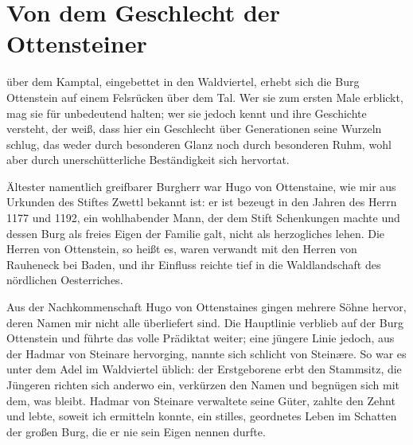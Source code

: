 
\section{Von dem Geschlecht der Ottensteiner}

 über dem Kamptal, eingebettet in den \gls{Waldviertel}, erhebt sich die Burg Ottenstein auf einem Felsrücken über dem Tal. Wer sie zum ersten Male erblickt, mag sie für unbedeutend halten; wer sie jedoch kennt und ihre Geschichte versteht, der weiß, dass hier ein Geschlecht über Generationen seine Wurzeln schlug, das weder durch besonderen Glanz noch durch besonderen Ruhm, wohl aber durch unerschütterliche Beständigkeit sich hervortat.

Ältester namentlich greifbarer Burgherr war \gls{Hugo von Ottenstaine}, wie mir aus Urkunden des Stiftes \gls{Zwettl} bekannt ist: er ist bezeugt in den Jahren des Herrn 1177 und 1192, ein wohlhabender Mann, der dem Stift Schenkungen machte und dessen Burg als freies Eigen der Familie galt, nicht als herzogliches \gls{lehen}. Die Herren von Ottenstein, so heißt es, waren verwandt mit den Herren von \gls{Rauheneck} bei \gls{Baden}, und ihr Einfluss reichte tief in die Waldlandschaft des nördlichen \gls{Oesterriche}s.

Aus der Nachkommenschaft \gls{Hugo von Ottenstaine}s gingen mehrere Söhne hervor, deren Namen mir nicht alle überliefert sind. Die Hauptlinie verblieb auf der Burg Ottenstein und führte das volle Prädiktat weiter; eine jüngere Linie jedoch, aus der \gls{Hadmar von Steinare} hervorging, nannte sich schlicht von Steinære. So war es unter dem Adel im \gls{Waldviertel} üblich: der Erstgeborene erbt den Stammsitz, die Jüngeren richten sich anderwo ein, verkürzen den Namen und begnügen sich mit dem, was bleibt. \gls{Hadmar von Steinare} verwaltete seine Güter, zahlte den Zehnt und lebte, soweit ich ermitteln konnte, ein stilles, geordnetes Leben im Schatten der großen Burg, die er nie sein Eigen nennen durfte.
